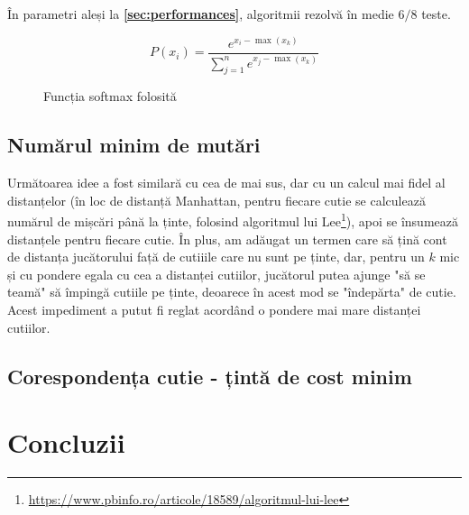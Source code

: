 \documentclass{article}
\begin{document}
În parametri aleși la \textbf{\ref{sec:performances}}, algoritmii rezolvă în 
medie $6/8$ teste.

\begin{figure}[ht]
    \[ P(x_i) = \frac{e^{x_i - \max(x_k)}}{\sum_{j=1}^n e^{x_j - \max(x_k)}} \]
    \caption{Funcția softmax folosită}
    \label{for:softmax}
\end{figure}

\subsection{Numărul minim de mutări}
Următoarea idee a fost similară cu cea de mai sus, dar cu un calcul mai fidel al
distanțelor (în loc de distanță Manhattan, pentru fiecare cutie se calculează 
numărul de mișcări până la ținte, folosind algoritmul lui 
Lee\footnote{\url{https://www.pbinfo.ro/articole/18589/algoritmul-lui-lee}}), 
apoi se însumează distanțele pentru fiecare cutie. În plus, am adăugat un 
termen care să țină cont de distanța jucătorului față de cutiiile care nu sunt 
pe ținte, dar, pentru un $k$ mic și cu pondere egala cu cea a distanței 
cutiilor, jucătorul putea ajunge "să se teamă" să împingă cutiile pe ținte, 
deoarece în acest mod se "îndepărta" de cutie. Acest impediment a putut fi 
reglat acordând o pondere mai mare distanței cutiilor.

\subsection{Corespondența cutie - țintă de cost minim}

\section{Concluzii}


\end{document}
